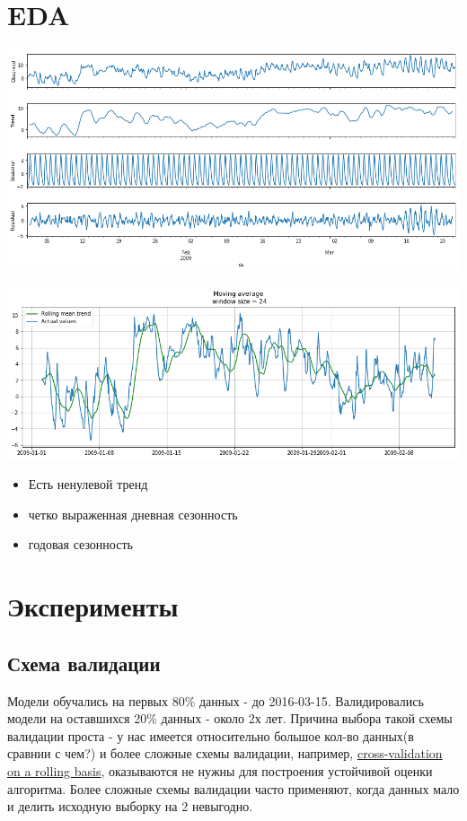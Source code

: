 \documentclass[11pt]{article}
\begin{document}
\section{EDA}
\label{sec:org602c4a2}
\begin{center}
\includegraphics[width=15cm]{./pics/sesonal_decomposition.png}
\end{center}
\begin{center}
\includegraphics[width=15cm]{./pics/rolling_mean.png}
\end{center}

\begin{itemize}
\item Есть ненулевой тренд
\item четко выраженная дневная сезонность
\item годовая сезонность
\end{itemize}
\section{Эксперименты}
\label{sec:org7d2340e}

\subsection{Схема валидации}
\label{sec:org922a7b8}
Модели обучались на первых 80\% данных - до 2016-03-15. Валидировались модели на оставшихся 20\% данных - около 2х
лет. Причина выбора такой схемы валидации проста -  у нас имеется относительно большое кол-во данных(в сравнии с чем?) и
более сложные схемы валидации, например, \href{https://habr.com/ru/company/ods/blog/327242/}{cross-validation on a rolling basis}, оказываются не нужны для построения
устойчивой оценки алгоритма. Более сложные схемы валидации часто применяют, когда данных мало и делить исходную выборку
на 2 невыгодно.
\end{document}
